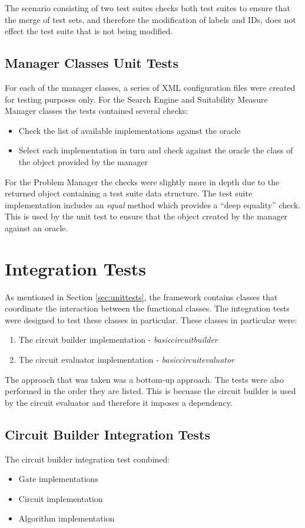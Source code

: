 The scenario consisting of two test suites checks both test suites to ensure that the merge of test sets, and therefore the modification of labels and IDs, does not effect the test suite that is not being modified.

\subsection{Manager Classes Unit Tests}
\label{sec:manclasstests}
For each of the manager classes, a series of XML configuration files were created for testing purposes only.
For the Search Engine and Suitability Measure Manager classes the tests contained several checks:
\begin{itemize}
 \item Check the list of available implementations against the oracle
 \item Select each implementation in turn and check against the oracle the class of the object provided by the manager
\end{itemize}

For the Problem Manager the checks were slightly more in depth due to the returned object containing a test suite data structure.
The test suite implementation includes an \emph{equal} method which provides a ``deep equality'' check.
This is used by the unit test to ensure that the object created by the manager against an oracle.

\section{Integration Tests}
As mentioned in Section \ref{sec:unittests}, the framework contains classes that coordinate the interaction between the functional classes.
The integration tests were designed to test these classes in particular.
These classes in particular were:
\begin{enumerate}
 \item The circuit builder implementation - \emph{basiccircuitbuilder}
 \item The circuit evaluator implementation - \emph{basiccircuitevaluator}
\end{enumerate}

The approach that was taken was a bottom-up approach.
The tests were also performed in the order they are listed.
This is becuase the circuit builder is used by the circuit evaluator and therefore it imposes a dependency.

\subsection{Circuit Builder Integration Tests}
The circuit builder integration test combined:
\begin{itemize}
 \item Gate implementations
 \item Circuit implementation
 \item Algorithm implementation
\end{itemize}

